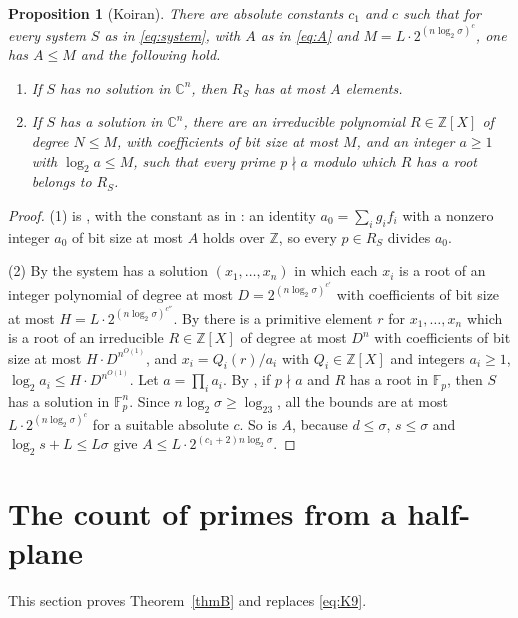 \documentclass[11pt]{amsart}
\newtheorem{proposition}[thm]{Proposition}
\theoremstyle{definition}
\theoremstyle{remark}
\newcommand{\Z}{\mathbb Z}
\newcommand{\C}{\mathbb C}
\newcommand{\F}{\mathbb F}
\begin{document}
\begin{proposition}[Koiran]\label{prop:koiran}
There are absolute constants $c_1$ and $c$ such that for every system $S$ as in \eqref{eq:system}, with $A$ as in \eqref{eq:A} and $M=L\cdot2^{(n\log_2\sigma)^c}$, one has $A\le M$ and the following hold.
\begin{enumerate}
\item If $S$ has no solution in $\C^n$, then $R_S$ has at most $A$ elements.
\item If $S$ has a solution in $\C^n$, there are an irreducible polynomial $R\in\Z[X]$ of degree $N\le M$, with coefficients of bit size at most $M$, and an integer $a\ge1$ with $\log_2a\le M$, such that every prime $p\nmid a$ modulo which $R$ has a root belongs to $R_S$.
\end{enumerate}
\end{proposition}

\begin{proof}
(1) is \cite[Theorem~5, p.~279]{K96}, with the constant as in \cite[Theorem~1]{K96}: an identity $a_0=\sum_ig_if_i$ with a nonzero integer $a_0$ of bit size at most $A$ holds over $\Z$, so every $p\in R_S$ divides $a_0$.

(2) By \cite[Theorem~7, p.~280]{K96} the system has a solution $(x_1,\dots,x_n)$ in which each $x_i$ is a root of an integer polynomial of degree at most $D=2^{(n\log_2\sigma)^{c'}}$ with coefficients of bit size at most $H=L\cdot2^{(n\log_2\sigma)^{c''}}$. By \cite[Theorem~4, p.~278]{K96} there is a primitive element $r$ for $x_1,\dots,x_n$ which is a root of an irreducible $R\in\Z[X]$ of degree at most $D^n$ with coefficients of bit size at most $H\cdot D^{n^{O(1)}}$, and $x_i=Q_i(r)/a_i$ with $Q_i\in\Z[X]$ and integers $a_i\ge1$, $\log_2a_i\le H\cdot D^{n^{O(1)}}$. Let $a=\prod_ia_i$. By \cite[Lemma~3, p.~281]{K96}, if $p\nmid a$ and $R$ has a root in $\F_p$, then $S$ has a solution in $\F_p^n$. Since $n\log_2\sigma\ge\log_23$, all the bounds are at most $L\cdot2^{(n\log_2\sigma)^c}$ for a suitable absolute $c$. So is $A$, because $d\le\sigma$, $s\le\sigma$ and $\log_2s+L\le L\sigma$ give $A\le L\cdot2^{(c_1+2)n\log_2\sigma}$.
\end{proof}

\section{The count of primes from a half-plane}\label{sec:count}
This section proves Theorem~\ref{thmB} and replaces \eqref{eq:K9}.
\end{document}
